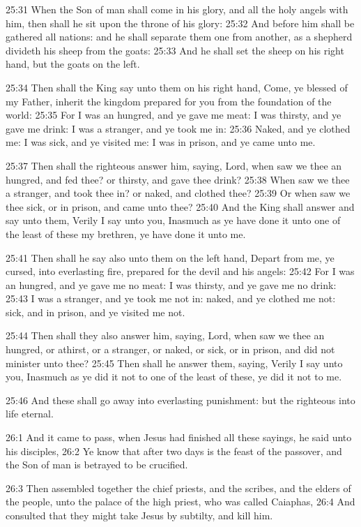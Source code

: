 25:31 When the Son of man shall come in his glory, and all the holy
angels with him, then shall he sit upon the throne of his glory: 25:32
And before him shall be gathered all nations: and he shall separate
them one from another, as a shepherd divideth his sheep from the
goats: 25:33 And he shall set the sheep on his right hand, but the
goats on the left.

25:34 Then shall the King say unto them on his right hand, Come, ye
blessed of my Father, inherit the kingdom prepared for you from the
foundation of the world: 25:35 For I was an hungred, and ye gave me
meat: I was thirsty, and ye gave me drink: I was a stranger, and ye
took me in: 25:36 Naked, and ye clothed me: I was sick, and ye visited
me: I was in prison, and ye came unto me.

25:37 Then shall the righteous answer him, saying, Lord, when saw we
thee an hungred, and fed thee? or thirsty, and gave thee drink?  25:38
When saw we thee a stranger, and took thee in? or naked, and clothed
thee?  25:39 Or when saw we thee sick, or in prison, and came unto
thee?  25:40 And the King shall answer and say unto them, Verily I say
unto you, Inasmuch as ye have done it unto one of the least of these
my brethren, ye have done it unto me.

25:41 Then shall he say also unto them on the left hand, Depart from
me, ye cursed, into everlasting fire, prepared for the devil and his
angels: 25:42 For I was an hungred, and ye gave me no meat: I was
thirsty, and ye gave me no drink: 25:43 I was a stranger, and ye took
me not in: naked, and ye clothed me not: sick, and in prison, and ye
visited me not.

25:44 Then shall they also answer him, saying, Lord, when saw we thee
an hungred, or athirst, or a stranger, or naked, or sick, or in
prison, and did not minister unto thee?  25:45 Then shall he answer
them, saying, Verily I say unto you, Inasmuch as ye did it not to one
of the least of these, ye did it not to me.

25:46 And these shall go away into everlasting punishment: but the
righteous into life eternal.

26:1 And it came to pass, when Jesus had finished all these sayings,
he said unto his disciples, 26:2 Ye know that after two days is the
feast of the passover, and the Son of man is betrayed to be crucified.

26:3 Then assembled together the chief priests, and the scribes, and
the elders of the people, unto the palace of the high priest, who was
called Caiaphas, 26:4 And consulted that they might take Jesus by
subtilty, and kill him.

